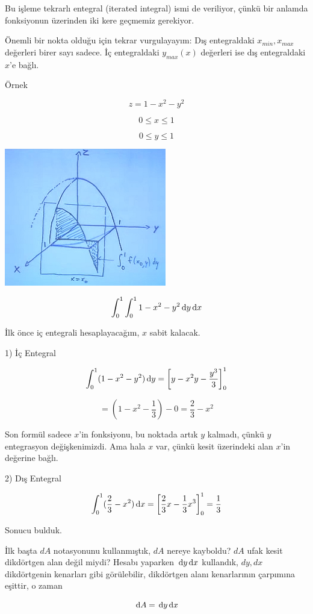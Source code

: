 \documentclass[12pt,fleqn]{article}\usepackage{../../common}
\begin{document}
Bu işleme tekrarlı entegral (iterated integral) ismi de veriliyor, çünkü
bir anlamda fonksiyonun üzerinden iki kere geçmemiz gerekiyor. 

Önemli bir nokta olduğu için tekrar vurgulayayım: Dış entegraldaki $x_{min},
x_{max}$ değerleri birer sayı sadece. İç entegraldaki $y_{max}(x)$ değerleri ise
dış entegraldaki $x$'e bağlı.

Örnek

$$ z = 1 - x^2 - y^2 $$

$$ 0 \le x \le 1 $$

$$ 0 \le y \le 1 $$

\includegraphics[height=6cm]{16_8.png}

$$ \int_0^1 \int_0^1  1-x^2-y^2 \,\mathrm{d} y \,\mathrm{d} x $$

İlk önce iç entegrali hesaplayacağım, $x$ sabit kalacak. 

1) İç Entegral

$$
\int_0^1 (1-x^2-y^2) \,\mathrm{d} y
= \bigg[ y - x^2y - \frac{y^3}{3} \bigg]_0^1
$$

$$ = (1 - x^2 - \frac{1}{3}) - 0 = \frac{2}{3} - x^2$$

Son formül sadece $x$'in fonksiyonu, bu noktada artık $y$ kalmadı, çünkü $y$
entegrasyon değişkenimizdi. Ama hala $x$ var, çünkü kesit üzerindeki alan $x$'in
değerine bağlı.

2) Dış Entegral 

$$
\int_0^1 (\frac{2}{3} - x^2) \,\mathrm{d} x
= \bigg[ \frac{2}{3}x - \frac{1}{3}x^3 \bigg]_0^1 = \frac{1}{3}
 $$

Sonucu bulduk. 

İlk başta $dA$ notasyonunu kullanmıştık, $dA$ nereye kayboldu? $dA$ ufak kesit
dikdörtgen alan değil miydi? Hesabı yaparken $\,\mathrm{d} y \,\mathrm{d} x$ kullandık, $dy,dx$
dikdörtgenin kenarları gibi görülebilir, dikdörtgen alanı kenarlarının çarpımına
eşittir, o zaman

$$ \,\mathrm{d} A = \,\mathrm{d} y \,\mathrm{d} x $$
\end{document}
